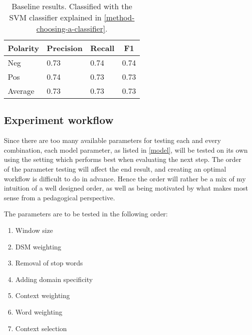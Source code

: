 \begin{table}
\centering
\begin{tabular}{llll}
\toprule
 \multicolumn{1}{c}{Polarity} & \multicolumn{1}{c}{Precision} & \multicolumn{1}{c}{Recall}
 & \multicolumn{1}{c}{F1} \\
\midrule
Neg      & 0.73      & 0.74   & 0.74     \\
Pos      & 0.74      & 0.73   & 0.73     \\
Average      & 0.73      & 0.73   & 0.73     \\
\bottomrule
\end{tabular}
\caption{Baseline results. Classified with the SVM classifier explained in \cref{method-choosing-a-classifier}.}
\label{tbl:baseline-results}
\end{table}

\subsection{Experiment workflow}\label{method-experiment-workflow}

Since there are too many available parameters for testing each and every combination, each model parameter, as listed in \cref{model}, will be tested on its own using the setting which performs best when evaluating the next step. The order of the parameter testing will affect the end result, and creating an optimal workflow is difficult to do in advance. Hence the order will rather be a mix of my intuition of a well designed order, as well as being motivated by what makes most sense from a pedagogical perspective.

The parameters are to be tested in the following order:

\begin{enumerate}
    \item Window size
    \item DSM weighting
    \item Removal of stop words
    \item Adding domain specificity
    \item Context weighting
    \item Word weighting
    \item Context selection
\end{enumerate}
